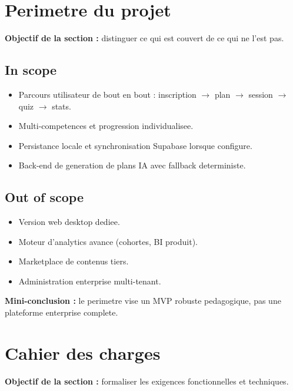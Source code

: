 \documentclass[12pt,a4paper]{article}
\begin{document}
\section{Perimetre du projet}
\textbf{Objectif de la section :} distinguer ce qui est couvert de ce qui ne l'est pas.

\subsection{In scope}
\begin{itemize}
  \item Parcours utilisateur de bout en bout : inscription $\rightarrow$ plan $\rightarrow$ session $\rightarrow$ quiz $\rightarrow$ stats.
  \item Multi-competences et progression individualisee.
  \item Persistance locale et synchronisation Supabase lorsque configure.
  \item Back-end de generation de plans IA avec fallback deterministe.
\end{itemize}

\subsection{Out of scope}
\begin{itemize}
  \item Version web desktop dediee.
  \item Moteur d'analytics avance (cohortes, BI produit).
  \item Marketplace de contenus tiers.
  \item Administration enterprise multi-tenant.
\end{itemize}

\textbf{Mini-conclusion :} le perimetre vise un MVP robuste pedagogique, pas une plateforme enterprise complete.

\section{Cahier des charges}
\textbf{Objectif de la section :} formaliser les exigences fonctionnelles et techniques.
\end{document}
